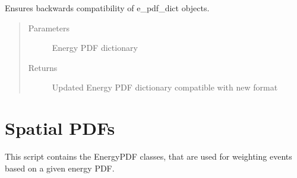 \documentclass[letterpaper,10pt,english]{sphinxmanual}
\begin{document}

\begin{fulllineitems}
\label{\detokenize{index:flarestack.core.energy_pdf.read_e_pdf_dict}}
Ensures backwards compatibility of e\_pdf\_dict objects.
\begin{quote}\begin{description}
\item[{Parameters}] \leavevmode
{} \textendash{} Energy PDF dictionary

\item[{Returns}] \leavevmode
Updated Energy PDF dictionary compatible with new format

\end{description}\end{quote}

\end{fulllineitems}



\section{Spatial PDFs}
\label{\detokenize{index:module-flarestack.core.energy_pdf}}\label{\detokenize{index:spatial-pdfs}}
This script contains the EnergyPDF classes, that are used for weighting
events based on a given energy PDF.
\end{document}
